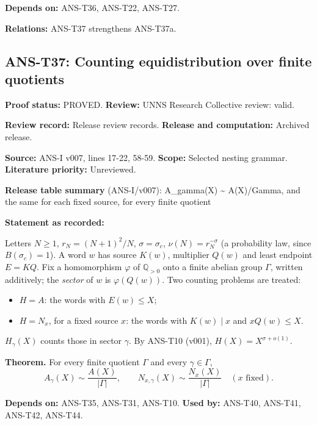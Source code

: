 \documentclass[
  11pt,
]{article}
\providecommand{\tightlist}{%
  \setlength{\itemsep}{0pt}\setlength{\parskip}{0pt}}
\begin{document}
\textbf{Depends on:} ANS-T36, ANS-T22, ANS-T27.

\textbf{Relations:} ANS-T37 strengthens ANS-T37a.

\hypertarget{ans-t37-counting-equidistribution-over-finite-quotients}{%
\subsection{ANS-T37: Counting equidistribution over finite
quotients}\label{ans-t37-counting-equidistribution-over-finite-quotients}}

\textbf{Proof status:} PROVED. \textbf{Review:} UNNS Research Collective
review: valid.

\textbf{Review record:} Release review records. \textbf{Release and
computation:} Archived release.

\textbf{Source:} ANS-I v007, lines 17-22, 58-59. \textbf{Scope:}
Selected nesting grammar. \textbf{Literature priority:} Unreviewed.

\textbf{Release table summary} (ANS-I/v007): A\_gamma(X)
\textasciitilde{} A(X)/\textbar Gamma\textbar, and the same for each
fixed source, for every finite quotient

\textbf{Statement as recorded:}

Letters \(N\ge1\), \(r_N=(N+1)^2/N\), \(\sigma=\sigma_c\),
\(\nu(N)=r_N^{-\sigma}\) (a probability law, since \(B(\sigma_c)=1\)). A
word \(w\) has source \(K(w)\), multiplier \(Q(w)\) and least endpoint
\(E=KQ\). Fix a homomorphism \(\varphi\) of \(\mathbb Q_{>0}\) onto a
finite abelian group \(\Gamma\), written additively; the \emph{sector}
of \(w\) is \(\varphi(Q(w))\). Two counting problems are treated:

\begin{itemize}
\tightlist
\item
  \(H=A\): the words with \(E(w)\le X\);
\item
  \(H=N_x\), for a fixed source \(x\): the words with \(K(w)\mid x\) and
  \(xQ(w)\le X\).
\end{itemize}

\(H_\gamma(X)\) counts those in sector \(\gamma\). By ANS-T10 (v001),
\(H(X)=X^{\sigma+o(1)}\).

\textbf{Theorem.} For every finite quotient \(\Gamma\) and every
\(\gamma\in\Gamma\),
\[A_\gamma(X)\sim\frac{A(X)}{|\Gamma|},\qquad N_{x,\gamma}(X)\sim\frac{N_x(X)}{|\Gamma|}\quad(x\text{ fixed}).\]

\textbf{Depends on:} ANS-T35, ANS-T31, ANS-T10. \textbf{Used by:}
ANS-T40, ANS-T41, ANS-T42, ANS-T44.
\end{document}
